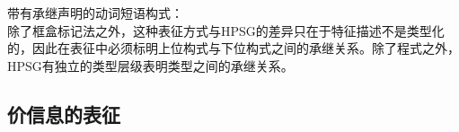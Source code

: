 \ea
带有承继声明的动词短语构式：\\
\setlength{\fboxsep}{2mm}
\z
除了框盒标记法之外，这种表征方式与HPSG的差异只在于特征描述不是类型化的，因此在表征中必须标明上位构式与下位构式之间的承继关系。除了程式之外，HPSG有独立的类型层级表明类型之间的承继关系。

\subsection{价信息的表征}

